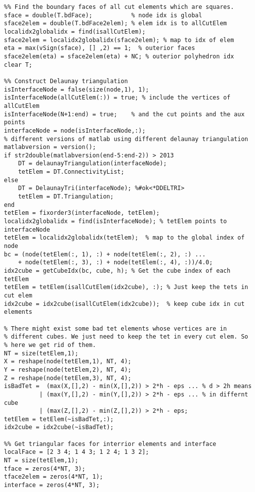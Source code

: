 \documentclass[12pt]{article}
\begin{document}
\begin{lstlisting}
%% Find the boundary faces of all cut elements which are squares.
sface = double(T.bdFace);           % node idx is global
sface2elem = double(T.bdFace2elem); % elem idx is to allCutElem
localidx2globalidx = find(isallCutElem);
sface2elem = localidx2globalidx(sface2elem); % map to idx of elem
eta = max(vSign(sface), [] ,2) == 1;  % outerior faces
sface2elem(eta) = sface2elem(eta) + NC; % outerior polyhedron idx
clear T;

%% Construct Delaunay triangulation
isInterfaceNode = false(size(node,1), 1);
isInterfaceNode(allCutElem(:)) = true; % include the vertices of allCutElem 
isInterfaceNode(N+1:end) = true;    % and the cut points and the aux points
interfaceNode = node(isInterfaceNode,:);
% different versions of matlab using different delaunay triangulation
matlabversion = version();
if str2double(matlabversion(end-5:end-2)) > 2013
    DT = delaunayTriangulation(interfaceNode);
    tetElem = DT.ConnectivityList;
else
    DT = DelaunayTri(interfaceNode); %#ok<*DDELTRI>
    tetElem = DT.Triangulation;
end
tetElem = fixorder3(interfaceNode, tetElem);
localidx2globalidx = find(isInterfaceNode); % tetElem points to interfaceNode
tetElem = localidx2globalidx(tetElem);  % map to the global index of node
bc = (node(tetElem(:, 1), :) + node(tetElem(:, 2), :) ...
    + node(tetElem(:, 3), :) + node(tetElem(:, 4), :))/4.0;
idx2cube = getCubeIdx(bc, cube, h); % Get the cube index of each tetElem
tetElem = tetElem(isallCutElem(idx2cube), :); % Just keep the tets in cut elem
idx2cube = idx2cube(isallCutElem(idx2cube));  % keep cube idx in cut elements

% There might exist some bad tet elements whose vertices are in
% different cubes. We just need to keep the tet in every cut elem. So
% here we get rid of them. 
NT = size(tetElem,1);
X = reshape(node(tetElem,1), NT, 4);
Y = reshape(node(tetElem,2), NT, 4);
Z = reshape(node(tetElem,3), NT, 4);
isBadTet =  (max(X,[],2) - min(X,[],2)) > 2*h - eps ... % d > 2h means
          | (max(Y,[],2) - min(Y,[],2)) > 2*h - eps ... % in differnt cube
          | (max(Z,[],2) - min(Z,[],2)) > 2*h - eps;
tetElem = tetElem(~isBadTet,:);
idx2cube = idx2cube(~isBadTet);

%% Get triangular faces for interrior elements and interface
localFace = [2 3 4; 1 4 3; 1 2 4; 1 3 2];
NT = size(tetElem,1);
tface = zeros(4*NT, 3);
tface2elem = zeros(4*NT, 1);
interface = zeros(4*NT, 3);


\end{lstlisting}
\end{document}
